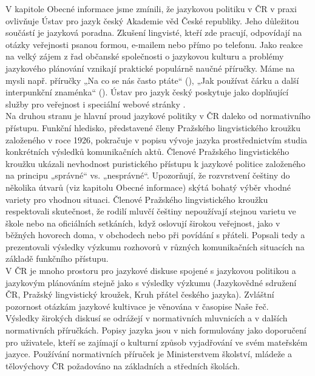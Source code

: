 \begin{multicols}{2}
V kapitole Obecné informace jsme zmínili, že jazykovou politiku v ČR v praxi ovlivňuje Ústav pro jazyk český Akademie věd České republiky. Jeho důležitou součástí je jazyková poradna. Zkušení lingvisté, kteří zde pracují, odpovídají na otázky veřejnosti psanou formou, e-mailem nebo přímo po telefonu. Jako reakce na velký zájem z řad občanské společnosti o jazykovou kulturu a problémy jazykového plánování vznikají praktické populárně naučné příručky. Máme na mysli např. příručky „Na co se nás často ptáte“ (\cite{Cerna}), „Jak používat čárku a další interpunkční znaménka“ (\cite{Janovec}). Ústav pro jazyk český poskytuje jako doplňující služby pro veřejnost i speciální webové stránky \cite{Note6}.\\
Na druhou stranu je hlavní proud jazykové politiky v ČR daleko od normativního přístupu. Funkční hledisko, představené členy Pražského lingvistického kroužku založeného v roce 1926, pokračuje v popisu vývoje jazyka prostřednictvím studia konkrétních výsledků komunikačních aktů. Členové Pražského lingvistického kroužku ukázali nevhodnost puristického přístupu k jazykové politice založeného na principu „správné“ vs. „nesprávné“. Upozorňují, že rozvrstvení češtiny do několika útvarů (viz kapitolu Obecné informace) skýtá bohatý výběr vhodné variety pro vhodnou situaci. Členové Pražského lingvistického kroužku respektovali skutečnost, že rodilí mluvčí češtiny nepoužívají stejnou varietu ve škole nebo na oficiálních setkáních, když oslovují širokou veřejnost, jako v běžných hovorech doma, v obchodech nebo při povídání s přáteli. Popsali tedy a prezentovali výsledky výzkumu rozhovorů v různých komunikačních situacích na základě funkčního přístupu.\\
V ČR je mnoho prostoru pro jazykové diskuse spojené s jazykovou politikou a jazykovým plánováním stejně jako s výsledky výzkumu (Jazykovědné sdružení ČR, Pražský lingvistický kroužek, Kruh přátel českého jazyka). Zvláštní pozornost otázkám jazykové kultivace je věnována v časopise Naše řeč.\\
Výsledky širokých diskusí se odrážejí v normativních mluvnicích a v dalších normativních příručkách. Popisy jazyka jsou v nich formulovány jako doporučení pro uživatele, kteří se zajímají o kulturní způsob vyjadřování ve svém mateřském jazyce. Používání normativních příruček je Ministerstvem školství, mládeže a tělovýchovy ČR požadováno na základních a středních školách.

  

\end{multicols}
